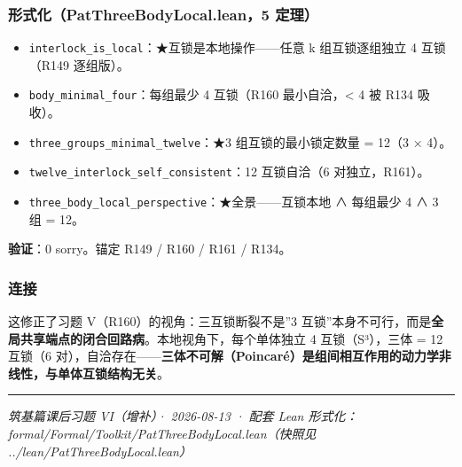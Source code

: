 \documentclass[
]{article}
\providecommand{\tightlist}{%
  \setlength{\itemsep}{0pt}\setlength{\parskip}{0pt}}
\begin{document}
\subsubsection{形式化（PatThreeBodyLocal.lean，5
定理）}\label{ux5f62ux5f0fux5316patthreebodylocal.lean5-ux5b9aux7406}

\begin{itemize}
\tightlist
\item
  \texttt{interlock\_is\_local}：★互锁是本地操作------任意 k
  组互锁逐组独立 4 互锁（R149 逐组版）。
\item
  \texttt{body\_minimal\_four}：每组最少 4 互锁（R160
  最小自洽，\textless{} 4 被 R134 吸收）。
\item
  \texttt{three\_groups\_minimal\_twelve}：★3 组互锁的最小锁定数量 =
  12（3 × 4）。
\item
  \texttt{twelve\_interlock\_self\_consistent}：12 互锁自洽（6
  对独立，R161）。
\item
  \texttt{three\_body\_local\_perspective}：★全景------互锁本地 ∧
  每组最少 4 ∧ 3 组 = 12。
\end{itemize}

\textbf{验证}：0 sorry。锚定 R149 / R160 / R161 / R134。

\subsubsection{连接}\label{ux8fdeux63a5}

这修正了习题 V（R160）的视角：三互锁断裂不是''3
互锁''本身不可行，而是\textbf{全局共享端点的闭合回路病}。本地视角下，每个单体独立
4 互锁（S³），三体 = 12 互锁（6
对），自洽存在------\textbf{三体不可解（Poincaré）是组间相互作用的动力学非线性，与单体互锁结构无关}。

\begin{center}\rule{0.5\linewidth}{0.5pt}\end{center}

\emph{筑基篇课后习题 VI（增补）· 2026-08-13 · 配套 Lean
形式化：formal/Formal/Toolkit/PatThreeBodyLocal.lean（快照见
../lean/PatThreeBodyLocal.lean）}
\end{document}
